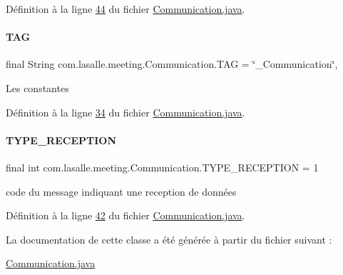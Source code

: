 Définition à la ligne \hyperlink{_communication_8java_source_l00044}{44} du fichier \hyperlink{_communication_8java_source}{Communication.\+java}.

\mbox{\label{classcom_1_1lasalle_1_1meeting_1_1_communication_a5d58f88df1f20b4d61edbed9a82eccab}} 
\paragraph{\texorpdfstring{T\+AG}{TAG}}
{\footnotesize\ttfamily final String com.\+lasalle.\+meeting.\+Communication.\+T\+AG = \char`\"{}\+\_\+\+Communication\char`\"{}\hspace{0.3cm}{\ttfamily [static]}, {\ttfamily [private]}}

Les constantes 

Définition à la ligne \hyperlink{_communication_8java_source_l00034}{34} du fichier \hyperlink{_communication_8java_source}{Communication.\+java}.

\mbox{\label{classcom_1_1lasalle_1_1meeting_1_1_communication_a4997d801f57344fb4eea7924903c2d6c}} 
\paragraph{\texorpdfstring{T\+Y\+P\+E\+\_\+\+R\+E\+C\+E\+P\+T\+I\+ON}{TYPE\_RECEPTION}}
{\footnotesize\ttfamily final int com.\+lasalle.\+meeting.\+Communication.\+T\+Y\+P\+E\+\_\+\+R\+E\+C\+E\+P\+T\+I\+ON = 1\hspace{0.3cm}{\ttfamily [static]}}



code du message indiquant une reception de données 



Définition à la ligne \hyperlink{_communication_8java_source_l00042}{42} du fichier \hyperlink{_communication_8java_source}{Communication.\+java}.



La documentation de cette classe a été générée à partir du fichier suivant \+:\begin{DoxyCompactItemize}
\item 
\hyperlink{_communication_8java}{Communication.\+java}\end{DoxyCompactItemize}
